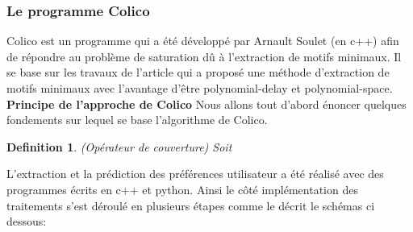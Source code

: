 \documentclass[a4paper,12pt,openany,oneside]{article}
\newtheorem{defn}{Definition} %
\begin{document}
\subsubsection{Le programme Colico}

Colico est un programme qui a été développé par Arnault Soulet (en c++) afin de répondre au problème de saturation dû à l'extraction de motifs minimaux. Il se base sur les travaux de l'article \cite{..} qui a proposé une méthode d'extraction de motifs minimaux avec l'avantage d'être polynomial-delay et polynomial-space. \\

\textbf{Principe de l'approche de Colico}
Nous allons tout d'abord énoncer quelques fondements sur lequel se base l'algorithme de Colico.

\begin{defn}(Opérateur de couverture)
 Soit 
\end{defn}






L'extraction et la prédiction des préférences utilisateur a été réalisé avec des programmes écrits en c++ et python. Ainsi le côté implémentation des traitements s'est déroulé en plusieurs étapes comme le décrit le schémas ci dessous:
\end{document}
